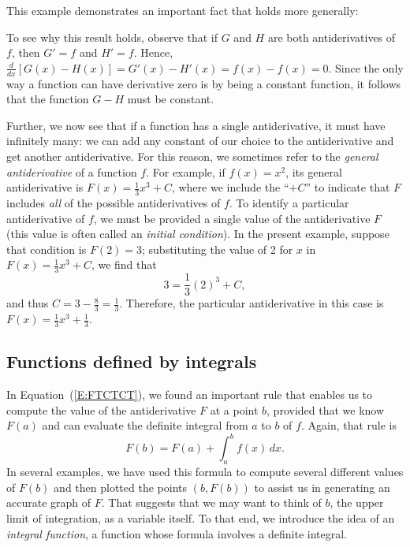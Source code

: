 This example demonstrates an important fact that holds more generally: 

 \vspace*{5pt}
\nin {}
\vspace*{1pt}

\nin To see why this result holds, observe that if $G$ and $H$ are both antiderivatives of $f$, then $G' = f$ and $H' = f$.  Hence, $\frac{d}{dx}[ G(x) - H(x) ] = G'(x) - H'(x) = f(x) - f(x) = 0$.  Since the only way a function can have derivative zero is by being a constant function, it follows that the function $G - H$ must be constant.

Further, we now see that if a function has a single antiderivative, it must have infinitely many: we can add any constant of our choice to the antiderivative and get another antiderivative.  For this reason, we sometimes refer to the \emph{general antiderivative}  of a function $f$.  For example, if $f(x) = x^2$, its general antiderivative is $F(x) = \frac{1}{3}x^3 + C$, where we include the ``$+C$'' to indicate that $F$ includes \emph{all} of the possible antiderivatives of $f$.  To identify a particular antiderivative of $f$, we must be provided a single value of the antiderivative $F$ (this value is often called an \emph{initial condition}).  In the present example, suppose that condition is $F(2) = 3$; substituting the value of 2 for $x$ in  $F(x) = \frac{1}{3}x^3 + C$, we find that
$$3 = \frac{1}{3}(2)^3 + C,$$
and thus $C = 3 - \frac{8}{3} = \frac{1}{3}$.  Therefore, the particular antiderivative in this case is $F(x) = \frac{1}{3}x^3 + \frac{1}{3}.$



\subsection*{Functions defined by integrals}

In Equation~(\ref{E:FTCTCT}), we found an important rule that enables us to compute the value of the antiderivative $F$ at a point $b$, provided that we know $F(a)$ and can evaluate the definite integral from $a$ to $b$ of $f$.  Again, that rule is
$$F(b) = F(a) + \int_a^b f(x) \, dx.$$
In several examples, we have used this formula to compute several different values of $F(b)$ and then plotted the points $(b,F(b))$ to assist us in generating an accurate graph of $F$.  That suggests that we may want to think of $b$, the upper limit of integration, as a variable itself.  To that end, we introduce the idea of an \emph{integral function}, a function whose formula involves a definite integral.

